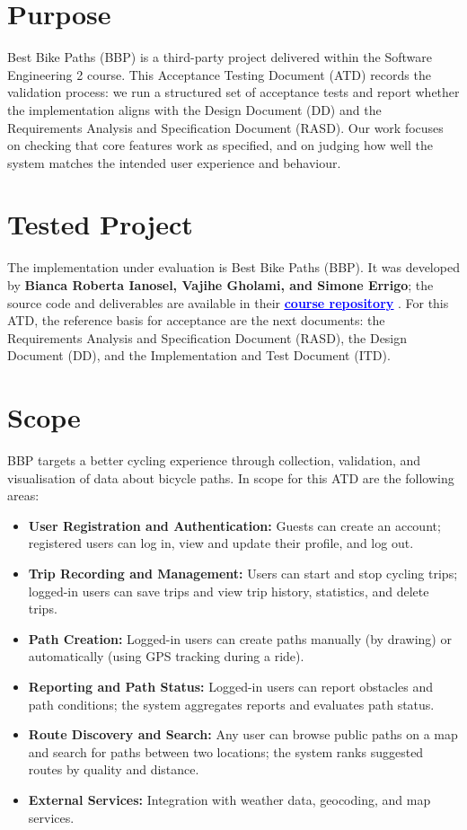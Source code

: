 \section{Purpose}
\label{sec:purpose}%
Best Bike Paths (BBP) is a third-party project delivered within the Software Engineering 2 course. This Acceptance Testing Document (ATD) records the validation process: we run a structured set of acceptance tests and report whether the implementation aligns with the Design Document (DD) and the Requirements Analysis and Specification Document (RASD). Our work focuses on checking that core features work as specified, and on judging how well the system matches the intended user experience and behaviour.

\section{Tested Project}
\label{sec:tested_project}%
The implementation under evaluation is Best Bike Paths (BBP). It was developed by \textbf{Bianca Roberta Ianosel, Vajihe Gholami, and Simone Errigo}; the source code and deliverables are available in their \href{https://github.com/BIA3IA/Errigo-Gholami-Ianosel}{\textbf{\textcolor{blue}{\underline{course repository}}}} . For this ATD, the reference basis for acceptance are the next documents: the Requirements Analysis and Specification Document (RASD), the Design Document (DD), and the Implementation and Test Document (ITD).

\section{Scope}
\label{subsec:scope}%

BBP targets a better cycling experience through collection, validation, and visualisation of data about bicycle paths. In scope for this ATD are the following areas:
\begin{itemize}
    \item \textbf{User Registration and Authentication:} Guests can create an account; registered users can log in, view and update their profile, and log out.
    \item \textbf{Trip Recording and Management:} Users can start and stop cycling trips; logged-in users can save trips and view trip history, statistics, and delete trips.
    \item \textbf{Path Creation:} Logged-in users can create paths manually (by drawing) or automatically (using GPS tracking during a ride).
    \item \textbf{Reporting and Path Status:} Logged-in users can report obstacles and path conditions; the system aggregates reports and evaluates path status.
    \item \textbf{Route Discovery and Search:} Any user can browse public paths on a map and search for paths between two locations; the system ranks suggested routes by quality and distance.
    \item \textbf{External Services:} Integration with weather data, geocoding, and map services.
\end{itemize}

